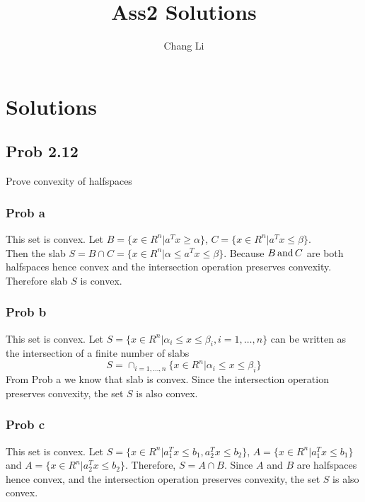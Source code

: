 \documentclass[10pt,a4paper]{article}
\begin{document}
\title{Ass2 Solutions}
\author{Chang Li}
\maketitle

\section{Solutions}

\subsection{Prob 2.12}

Prove convexity of halfspaces

\subsubsection{Prob a}
This set is convex. Let $B = \{x\in R^n | a^Tx\geq\alpha\}$, $C = \{x\in R^n | a^Tx\leq\beta\}$. \\
Then the slab $S=B\cap C=\{x\in R^n | \alpha\leq a^Tx\leq\beta\}$.
Because $B \text{\,and\,} C$ are both halfspaces hence convex and the intersection operation preserves convexity. Therefore slab $S$ is convex.

\subsubsection{Prob b}
This set is convex. Let $S = \{x\in R^n | \alpha_i\leq x\leq\beta_i, i = 1,\dots,n\}$ can be written as the intersection of a finite number of slabs
$$
S = \cap_{i=1,\dots,n} \{x\in R^n | \alpha_i\leq x\leq\beta_i\}
$$
From Prob a we know that slab is convex. Since the intersection operation preserves convexity, the set $S$ is also convex.

\subsubsection{Prob c}
This set is convex. Let $S = \{x\in R^n | a_1^Tx\leq b_1, a_2^Tx\leq b_2\}$, $A = \{x\in R^n | a_1^Tx\leq b_1\}$ and $A = \{x\in R^n | a_2^Tx\leq b_2\}$. Therefore, $S = A \cap B$. Since $A$ and $B$ are halfspaces hence convex, and the intersection operation preserves convexity, the set $S$ is also convex.
\end{document}
